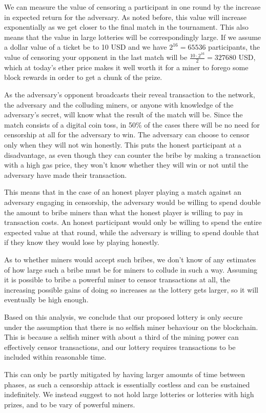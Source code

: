 We can measure the value of censoring a participant in one round by the increase in expected return for the adversary. As noted before, this value will increase exponentially as we get closer to the final match in the tournament. This also means that the value in large lotteries will be correspondingly large. If we assume a dollar value of a ticket be to 10 USD and we have $2^{16}=65536$ participants, the value of censoring your opponent in the last match will be $\frac{10 \cdot 2^{16}}{2}=327680$ USD, which at today's ether price makes it well worth it for a miner to forego some block rewards in order to get a chunk of the prize.

As the adversary's opponent broadcasts their reveal transaction to the network, the adversary and the colluding miners, or anyone with knowledge of the adversary's secret, will know what the result of the match will be. Since the match consists of a digital coin toss, in 50\% of the cases there will be no need for censorship at all for the adversary to win. The adversary can choose to censor only when they will not win honestly. This puts the honest participant at a disadvantage, as even though they can counter the bribe by making a transaction with a high gas price, they won't know whether they will win or not until the adversary have made their transaction.

This means that in the case of an honest player playing a match against an adversary engaging in censorship, the adversary would be willing to spend double the amount to bribe miners than what the honest player is willing to pay in transaction costs. An honest participant would only be willing to spend the entire expected value at that round, while the adversary is willing to spend double that if they know they would lose by playing honestly.

As to whether miners would accept such bribes, we don't know of any estimates of how large such a bribe must be for miners to collude in such a way. Assuming it is possible to bribe a powerful miner to censor transactions at all, the increasing possible gains of doing so increases as the lottery gets larger, so it will eventually be high enough.

Based on this analysis, we conclude that our proposed lottery is only secure under the assumption that there is no selfish miner behaviour on the blockchain. This is because a selfish miner with about a third of the mining power can effectively censor transactions, and our lottery requires transactions to be included within reasonable time. 

This can only be partly mitigated by having larger amounts of time between phases, as such a censorship attack is essentially costless and can be sustained indefinitely. We instead suggest to not hold large lotteries or lotteries with high prizes, and to be vary of powerful miners.